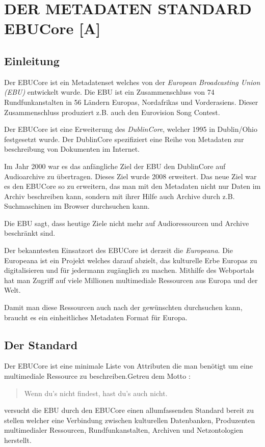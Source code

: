 	\section{DER METADATEN STANDARD EBUCore [A]}
	
	\subsection{Einleitung}
	Der EBUCore ist ein Metadatenset welches von der \emph{European Broadcasting Union (EBU)} entwickelt wurde. Die EBU ist ein Zusammenschluss von 74 Rundfunkanstalten  in 56 Ländern Europas, Nordafrikas und Vorderasiens. Dieser Zusammenschluss produziert z.B. auch den Eurovision Song Contest.
	
	Der EBUCore ist eine Erweiterung des \emph{DublinCore}, welcher 1995 in Dublin/Ohio festgesetzt wurde. Der DublinCore spezifiziert eine Reihe von Metadaten zur beschreibung von Dokumenten im Internet.
	
	Im Jahr 2000 war es das anfängliche Ziel der EBU den DublinCore auf Audioarchive zu übertragen. Dieses Ziel wurde 2008 erweitert. Das neue Ziel war es den EBUCore so zu erweitern, das man mit den Metadaten nicht nur Daten im Archiv beschreiben kann, sondern mit ihrer Hilfe auch Archive durch z.B. Suchmaschinen im Browser durchsuchen kann.
	
	Die EBU sagt, dass heutige Ziele nicht mehr auf Audioressourcen und Archive beschränkt sind.
	
	Der bekanntesten Einsatzort des EBUCore ist derzeit die \emph{Europeana}. Die Europeana ist ein Projekt welches darauf abzielt, das kulturelle Erbe Europas zu digitalisieren und für jedermann zugänglich zu machen. Mithilfe des Webportals hat man Zugriff auf viele Millionen multimediale Ressourcen aus Europa und der Welt.
	
	Damit man diese Ressourcen auch nach der gewünschten durchsuchen kann, braucht es ein einheitliches Metadaten Format für Europa.
	
	\subsection{Der Standard}
	Der EBUCore ist eine minimale Liste von Attributen die man benötigt um eine multimediale Ressource zu beschreiben.Getreu dem Motto :\begin{quote}Wenn du's nicht findest, hast du's auch nicht.\end{quote} versucht die EBU durch den EBUCore einen allumfassenden Standard bereit zu stellen welcher eine Verbindung zwischen kulturellen Datenbanken, Produzenten multimedialer Ressourcen, Rundfunkanstalten, Archiven und Netzontologien herstellt.
	
